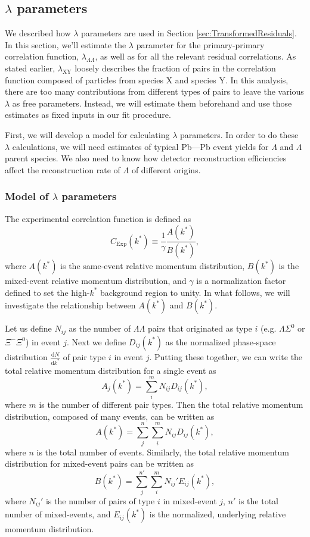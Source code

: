 \subsection{$\lambda$ parameters}
\label{sec:LambdaParams}

We described how $\lambda$ parameters are used in Section \ref{sec:TransformedResiduals}. In this section, we'll estimate the $\lambda$ parameter for the primary-primary correlation function, $\lambda_{\Lambda\Lambda}$, as well as for all the relevant residual correlations.
As stated earlier, $\lambda_\mathrm{XY}$ loosely describes the fraction of pairs in the correlation function composed of particles from species X and species Y.
In this analysis, there are too many contributions from different types of pairs to leave the various $\lambda$ as free parameters.
Instead, we will estimate them beforehand and use those estimates as fixed inputs in our fit procedure.

First, we will develop a model for calculating $\lambda$ parameters. 
In order to do these $\lambda$ calculations, we will need estimates of typical Pb---Pb event yields for $\Lambda$ and $\Lambda$ parent species.
We also need to know how detector reconstruction efficiencies affect the reconstruction rate of $\Lambda$ of different origins.

\subsubsection{Model of $\lambda$ parameters}
\label{sec:LambdaModel}

The experimental correlation function is defined as 
\begin{equation}
\label{eq:ExpCorrelationFunction}
C_{\mathrm{Exp}}(k^*) \equiv \frac{1}{\gamma} \frac{A(k^*)}{B(k^*)},
\end{equation}
where $A(k^*)$ is the same-event relative momentum distribution, $B(k^*)$ is the mixed-event relative momentum distribution, and $\gamma$ is a normalization factor defined to set the high-$k^*$ background region to unity. 
In what follows, we will investigate the relationship between $A(k^*)$ and $B(k^*)$. 


Let us define $N_{ij}$ as the number of $\Lambda\Lambda$ pairs that originated as type $i$ (e.g. $\Lambda\Sigma^0$ or $\Xi^-\Xi^0$) in event $j$.
Next we define $D_{ij}(k^*)$ as the normalized phase-space distribution $\frac{\mathrm{d}N}{\mathrm{d}k^*}$ of pair type $i$ in event $j$. 
Putting these together, we can write the total relative momentum distribution for a single event as
$$A_j(k^*) = \sum_i^m N_{ij} D_{ij}(k^*),$$
where $m$ is the number of different pair types.
Then the total relative momentum distribution, composed of many events, can be written as
$$A(k^*) = \sum_j^n \sum_i^m N_{ij} D_{ij}(k^*),$$
where $n$ is the total number of events.
Similarly, the total relative momentum distribution for mixed-event pairs can be written as
$$B(k^*) = \sum_j^{n'} \sum_i^m N_{ij}' E_{ij}(k^*),$$
where $N_{ij}'$ is the number of pairs of type $i$ in mixed-event $j$, $n'$ is the total number of mixed-events, and $E_{ij}(k^*)$ is the normalized, underlying relative momentum distribution.

